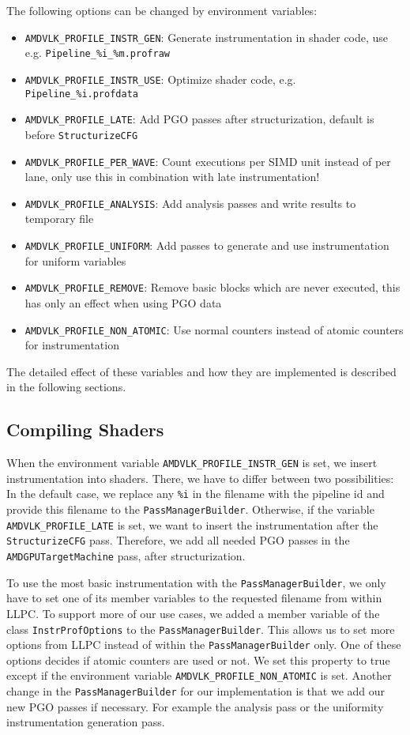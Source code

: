 The following options can be changed by environment variables:
\begin{itemize}
	\item \texttt{AMDVLK\_PROFILE\_INSTR\_GEN}: Generate instrumentation in shader code, use e.g. \texttt{Pipeline\_\%i\_\%m.profraw}
	\item \texttt{AMDVLK\_PROFILE\_INSTR\_USE}: Optimize shader code, e.g. \texttt{Pipeline\_\%i.profdata}
	\item \texttt{AMDVLK\_PROFILE\_LATE}: Add PGO passes after structurization, default is before \texttt{StructurizeCFG}
	\item \texttt{AMDVLK\_PROFILE\_PER\_WAVE}: Count executions per SIMD unit instead of per lane, only use this in combination with late instrumentation!
	\item \texttt{AMDVLK\_PROFILE\_ANALYSIS}: Add analysis passes and write results to temporary file
	\item \texttt{AMDVLK\_PROFILE\_UNIFORM}: Add passes to generate and use instrumentation for uniform variables
	\item \texttt{AMDVLK\_PROFILE\_REMOVE}: Remove basic blocks which are never executed, this has only an effect when using PGO data
	\item \texttt{AMDVLK\_PROFILE\_NON\_ATOMIC}: Use normal counters instead of atomic counters for instrumentation
\end{itemize}

The detailed effect of these variables and how they are implemented is described in the following sections.

\subsection{Compiling Shaders}
\label{sub:compiling}
When the environment variable \texttt{AMDVLK\_PROFILE\_INSTR\_GEN} is set, we insert instrumentation into shaders. There, we have to differ between two possibilities:
In the default case, we replace any \texttt{\%i} in the filename with the pipeline id and provide this filename to the \texttt{PassManagerBuilder}.
Otherwise, if the variable \texttt{AMDVLK\_PROFILE\_LATE} is set, we want to insert the instrumentation after the \texttt{StructurizeCFG} pass.
Therefore, we add all needed PGO passes in the \texttt{AMDGPUTargetMachine} pass, after structurization.

To use the most basic instrumentation with the \texttt{PassManagerBuilder}, we only have to set one of its member variables to the requested filename from within LLPC.
To support more of our use cases, we added a member variable of the class \texttt{InstrProfOptions} to the \texttt{PassManagerBuilder}.
This allows us to set more options from LLPC instead of within the \texttt{PassManagerBuilder} only.
One of these options decides if atomic counters are used or not.
We set this property to true except if the environment variable \texttt{AMDVLK\_PROFILE\_NON\_ATOMIC} is set.
Another change in the \texttt{PassManagerBuilder} for our implementation is that we add our new PGO passes if necessary.
For example the analysis pass or the uniformity instrumentation generation pass.

